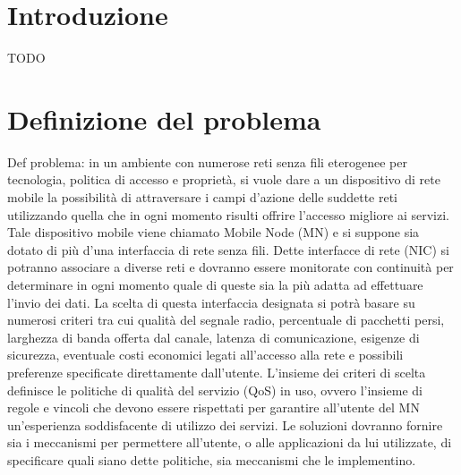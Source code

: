 \documentclass[12pt,a4paper,openright,twoside]{book}
\begin{document}
%
%
\begin{titlepage}
  \thispagestyle{empty}
  \topmargin=6.5cm
  \raggedleft
  \large
  \newpage
  \clearpage{\pagestyle{empty}\cleardoublepage}
\end{titlepage}



\chapter*{Introduzione}

TODO

\clearpage{\pagestyle{empty}\cleardoublepage}

\tableofcontents
\rhead[\fancyplain{}{\bfseries\leftmark}]{\fancyplain{}{\bfseries\thepage}}
\clearpage{\pagestyle{empty}\cleardoublepage}

\chapter{Definizione del problema}
Def problema: in un ambiente con numerose reti senza fili eterogenee
per tecnologia, politica di accesso e proprietà, si vuole dare a un
dispositivo di rete mobile la possibilità di attraversare i campi
d'azione delle suddette reti utilizzando quella che in ogni momento
risulti offrire l'accesso migliore ai servizi. Tale dispositivo mobile
viene chiamato Mobile Node (MN) e si suppone sia dotato di più d'una
interfaccia di rete senza fili. Dette interfacce di rete (NIC) si
potranno associare a diverse reti e dovranno essere monitorate con
continuità per determinare in ogni momento quale di queste sia la più
adatta ad effettuare l'invio dei dati. La scelta di questa interfaccia
designata si potrà basare su numerosi criteri tra cui qualità del
segnale radio, percentuale di pacchetti persi, larghezza di banda
offerta dal canale, latenza di comunicazione, esigenze di sicurezza,
eventuale costi economici legati all'accesso alla rete e possibili
preferenze specificate direttamente dall'utente. L'insieme dei criteri
di scelta definisce le politiche di qualità del servizio (QoS) in uso,
ovvero l'insieme di regole e vincoli che devono essere rispettati per
garantire all'utente del MN un'esperienza soddisfacente di utilizzo
dei servizi. Le soluzioni dovranno fornire sia i meccanismi per
permettere all'utente, o alle applicazioni da lui utilizzate, di
specificare quali siano dette politiche, sia meccanismi che le
implementino.
\end{document}
